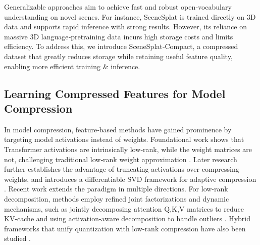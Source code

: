 \documentclass{article}
\begin{document}
Generalizable approaches aim to achieve fast and robust open‑vocabulary understanding on novel scenes. For instance, SceneSplat \cite{li2025scenesplat} is trained directly on 3D data and supports rapid inference with strong results. However, its reliance on massive 3D language‑pretraining data incurs high storage costs and limits efficiency. To address this, we introduce SceneSplat‑Compact, a compressed dataset that greatly reduces storage while retaining useful feature quality, enabling more efficient training \& inference.
\subsection{Learning Compressed Features for Model Compression}
In model compression, feature‑based methods have gained prominence by targeting model activations instead of weights. Foundational work shows that Transformer activations are intrinsically low‑rank, while the weight matrices are not, challenging traditional low‑rank weight approximation \cite{yu2023compressing}. Later research further establishes the advantage of truncating activations over compressing weights, and introduces a differentiable SVD framework for adaptive compression \cite{wang2025dobi}.
Recent work extends the paradigm in multiple directions. For low-rank decomposition, methods employ refined joint factorizations and dynamic mechanisms, such as jointly decomposing attention Q,K,V matrices to reduce KV-cache \cite{wang2025qsvd} and using activation-aware decomposition to handle outliers \cite{tsitsikas2020nsvd}. Hybrid frameworks that unify quantization with low-rank compression have also been studied \cite{chiang2025uniql,mikaelyan2025deltallm}.
\end{document}
